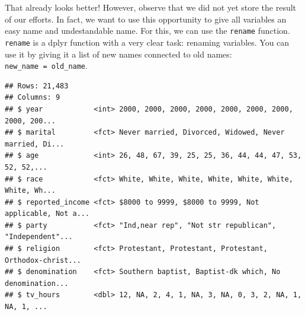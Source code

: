 \documentclass[]{tufte-book}
\newenvironment{Shaded}{}{}
\newcommand{\DataTypeTok}[1]{\textcolor[rgb]{0.56,0.13,0.00}{#1}}
\newcommand{\KeywordTok}[1]{\textcolor[rgb]{0.00,0.44,0.13}{\textbf{#1}}}
\newcommand{\NormalTok}[1]{#1}
\newcommand{\OperatorTok}[1]{\textcolor[rgb]{0.40,0.40,0.40}{#1}}
\newcommand{\StringTok}[1]{\textcolor[rgb]{0.25,0.44,0.63}{#1}}
\begin{document}
That already looks better! However, observe that we did not yet store the result of our efforts. In fact, we want to use this opportunity to give all variables an easy name and undestandable name. For this, we can use the \texttt{rename} function. \texttt{rename} is a dplyr function with a very clear task: renaming variables. You can use it by giving it a list of new names connected to old names: \texttt{new\_name\ =\ old\_name}.

\begin{Shaded}
\end{Shaded}

\begin{verbatim}
## Rows: 21,483
## Columns: 9
## $ year            <int> 2000, 2000, 2000, 2000, 2000, 2000, 2000, 2000, 200...
## $ marital         <fct> Never married, Divorced, Widowed, Never married, Di...
## $ age             <int> 26, 48, 67, 39, 25, 25, 36, 44, 44, 47, 53, 52, 52,...
## $ race            <fct> White, White, White, White, White, White, White, Wh...
## $ reported_income <fct> $8000 to 9999, $8000 to 9999, Not applicable, Not a...
## $ party           <fct> "Ind,near rep", "Not str republican", "Independent"...
## $ religion        <fct> Protestant, Protestant, Protestant, Orthodox-christ...
## $ denomination    <fct> Southern baptist, Baptist-dk which, No denomination...
## $ tv_hours        <dbl> 12, NA, 2, 4, 1, NA, 3, NA, 0, 3, 2, NA, 1, NA, 1, ...
\end{verbatim}
\end{document}
